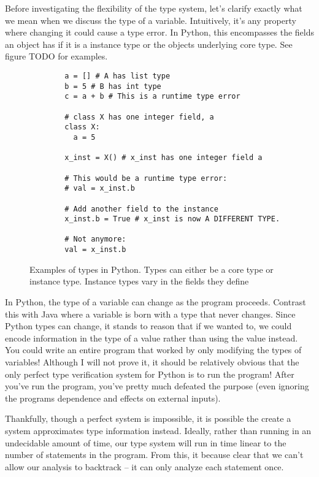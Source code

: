 \documentclass{article}[12pt]
\begin{document}
Before investigating the flexibility of the type system, let's clarify exactly what we mean when we
discuss the type of a variable. Intuitively, it's any property where changing it could cause a type
error. In Python, this encompasses the fields an object has if it is a instance type or the objects
underlying core type. See figure TODO for examples.

\begin{figure}
    \begin{verbatim}
        a = [] # A has list type
        b = 5 # B has int type
        c = a + b # This is a runtime type error

        # class X has one integer field, a
        class X:
          a = 5

        x_inst = X() # x_inst has one integer field a

        # This would be a runtime type error:
        # val = x_inst.b
        
        # Add another field to the instance
        x_inst.b = True # x_inst is now A DIFFERENT TYPE. 
        
        # Not anymore:
        val = x_inst.b
    \end{verbatim}
    \caption{Examples of types in Python. Types can either be a core type or instance type. Instance
    types vary in the fields they define}
\end{figure}

In Python, the type of a variable can change as the program proceeds. Contrast this with Java where
a variable is born with a type that never changes. Since Python types can change, it stands to
reason that if we wanted to, we could encode information in the type of a value rather than using
the value instead. You could write an entire program that worked by only modifying the types of
variables! Although I will not prove it, it should be relatively obvious that the only perfect type
verification system for Python is to run the program! After you've run the program, you've pretty
much defeated the purpose (even ignoring the programs dependence and effects on external inputs).


Thankfully, though a perfect system is impossible, it is possible the create a system approximates
type information instead. Ideally, rather than running in an undecidable amount of time, our type
system will run in time linear to the number of statements in the program. From this, it because
clear that we can't allow our analysis to backtrack -- it can only analyze each statement once. 
\end{document}
